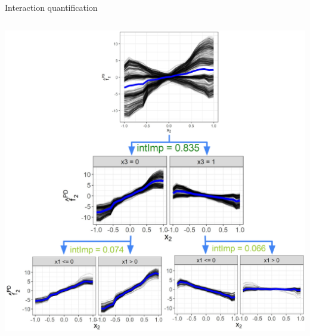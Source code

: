 \documentclass[11pt,compress,t,notes=noshow, aspectratio=169, xcolor=table,dvipsnames]{beamer}
\begin{document}
\begin{frame}{Interaction quantification}
\begin{columns}[T, totalwidth=\textwidth]
\begin{column}{0.52\textwidth}
    \centering
    \includegraphics[width=\textwidth]{figure/sim1}
    

\end{column}
\end{columns}
\end{frame}
\end{document}
